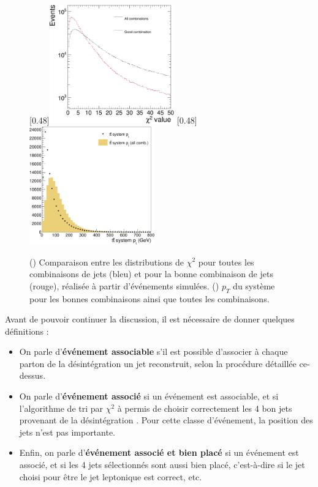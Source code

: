 \begin{figure}[tbp] \centering
    \subcaptionbox{\label{fig:chi2_distribution}}[0.48\textwidth]{\includegraphics[width=0.48\textwidth]{chapitre6/figs/chi2/chi2_distribution.pdf}} \hfill
    \subcaptionbox{\label{fig:chi2_ptsyst}}[0.48\textwidth]{\includegraphics[width=0.48\textwidth]{chapitre6/figs/chi2/chi2_discrimant_combinations_pt_syst.pdf}}
    \caption{() Comparaison entre les distributions de $\chi^2$ pour toutes les combinaisons de jets (\textcolor{bleu_gris}{bleu}) et pour la bonne combinaison de jets (\textcolor{rouge_grandmere}{rouge}), réalisée à partir d'événements \ttbar simulées. () $p_T$ du système \ttbar pour les bonnes combinaisons ainsi que toutes les combinaisons.}
\end{figure}

Avant de pouvoir continuer la discussion, il est nécessaire de donner quelques définitions :

\begin{itemize}
    \item On parle d'\textbf{événement associable} s'il est possible d'associer à chaque parton de la désintégration \ttbar un jet reconstruit, selon la procédure détaillée ce-dessus.
    \item On parle d'\textbf{événement associé} si un événement est associable, et si l'algorithme de tri par $\chi^2$ à permis de choisir correctement les 4 bon jets provenant de la désintégration \ttbar. Pour cette classe d'événement, la position des jets n'est pas importante.
    \item Enfin, on parle d'\textbf{événement associé et bien placé} si un événement est associé, et si les 4 jets sélectionnés sont aussi bien placé, c'est-à-dire si le jet choisi pour être le jet \Pbottom leptonique est correct, etc.
\end{itemize}

